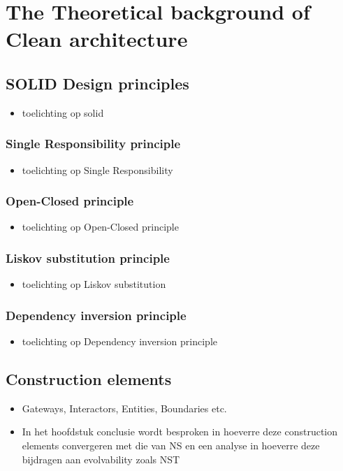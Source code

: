 \section{The Theoretical background of Clean architecture}\label{sec:ca_theory}

\subsection{SOLID Design principles} \label{subsec:solid}

\begin{itemize}
    \item toelichting op solid
\end{itemize}

\subsubsection{Single Responsibility principle}
\begin{itemize}
    \item toelichting op Single Responsibility
\end{itemize}

\subsubsection{Open-Closed principle}
\begin{itemize}
    \item toelichting op Open-Closed principle
\end{itemize}

\subsubsection{Liskov substitution principle}
\begin{itemize}
    \item toelichting op Liskov substitution
\end{itemize}

\subsubsection{Dependency inversion principle}
\begin{itemize}
    \item toelichting op Dependency inversion principle
\end{itemize}

\subsection{Construction elements}
\begin{itemize}
    \item Gateways, Interactors, Entities, Boundaries etc. 
    \item In het hoofdstuk conclusie wordt
    besproken in hoeverre deze construction elements convergeren met die van NS en een
    analyse in hoeverre deze bijdragen aan evolvability zoals NST
\end{itemize}
